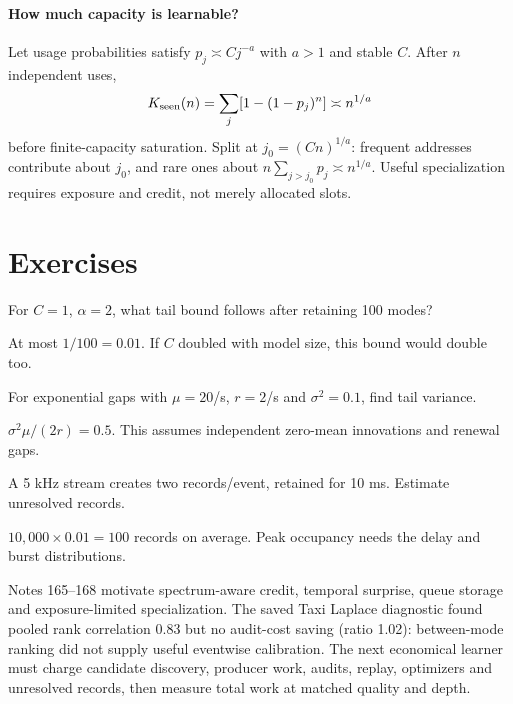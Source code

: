 \documentclass[11pt]{article}
\begin{document}
\paragraph{How much capacity is learnable?} Let usage probabilities satisfy $p_j\asymp Cj^{-a}$ with $a>1$ and stable $C$. After $n$ independent uses,
\[
 K_{\rm seen}(n)=\sum_j[1-(1-p_j)^n]\asymp n^{1/a}
\]
before finite-capacity saturation. Split at $j_0=(Cn)^{1/a}$: frequent addresses contribute about $j_0$, and rare ones about $n\sum_{j>j_0}p_j\asymp n^{1/a}$. Useful specialization requires exposure and credit, not merely allocated slots.
\section*{Exercises}
\begin{exercise}For $C=1$, $\alpha=2$, what tail bound follows after retaining 100 modes?\end{exercise}
\begin{solution}At most $1/100=0.01$. If $C$ doubled with model size, this bound would double too.\end{solution}
\begin{exercise}For exponential gaps with $\mu=20$/s, $r=2$/s and $\sigma^2=0.1$, find tail variance.\end{exercise}
\begin{solution}$\sigma^2\mu/(2r)=0.5$. This assumes independent zero-mean innovations and renewal gaps.\end{solution}
\begin{exercise}A 5 kHz stream creates two records/event, retained for 10 ms. Estimate unresolved records.\end{exercise}
\begin{solution}$10{,}000\times0.01=100$ records on average. Peak occupancy needs the delay and burst distributions.\end{solution}
\begin{inourmodels}
Notes 165--168 motivate spectrum-aware credit, temporal surprise, queue storage and exposure-limited specialization. The saved Taxi Laplace diagnostic found pooled rank correlation 0.83 but no audit-cost saving (ratio 1.02): between-mode ranking did not supply useful eventwise calibration. The next economical learner must charge candidate discovery, producer work, audits, replay, optimizers and unresolved records, then measure total work at matched quality and depth.
\end{inourmodels}
\end{document}
